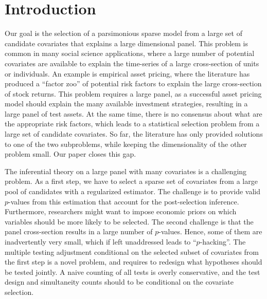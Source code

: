 \documentclass[11pt]{article}
\def\cmt#1{{\textcolor{red}{(#1)}}}
\begin{document}
	
	\onehalfspacing 
	
	
	
	
	
	\section{Introduction}
	
	
	
	
	Our goal is the selection of a parsimonious sparse model from a large set of candidate covariates that explains a large dimensional panel. This problem is common in many social science applications, where a large number of potential covariates are available to explain the time-series of a large cross-section of units or individuals. An example is empirical asset pricing, where the literature has produced a “factor zoo” of potential risk factors to explain the large cross-section of stock returns. This problem requires a large panel, as a successful asset pricing model should explain the many available investment strategies, resulting in a large panel of test assets. At the same time, there is no consensus about what are the appropriate risk factors, which leads to a statistical selection problem from a large set of candidate covariates. So far, the literature has only provided solutions to one of the two subproblems, while keeping the dimensionality of the other problem small. Our paper closes this gap.
	
	
	
	The inferential theory on a large panel with many covariates is a challenging problem. As a first step, we have to select a sparse set of covariates from a large pool of candidates with a regularized estimator. The challenge is to provide valid $p$-values from this estimation that account for the post-selection inference. Furthermore, researchers might want to impose economic priors on which variables should be more likely to be selected. The second challenge is that the panel cross-section results in a large number of $p$-values. Hence, some of them are inadvertently very small, which if left unaddressed leads to ``$p$-hacking''.
	The multiple testing adjustment conditional on the selected subset of covariates from the first step is a novel problem, and requires to redesign what hypotheses should be tested jointly. A naive counting of all tests is overly conservative, and the test design and simultaneity counts should to be conditional on the covariate selection. %
	
\end{document}
